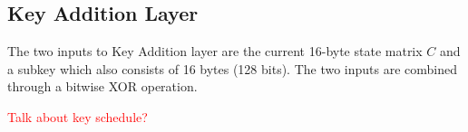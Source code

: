 \subsection{Key Addition Layer}
\label{sec:key-addition}

The two inputs to Key Addition layer are the current 16-byte state matrix $C$ and a subkey which also consists of 16 bytes (128 bits).
The two inputs are combined through a bitwise XOR operation.

\textcolor{red}{Talk about key schedule?}
